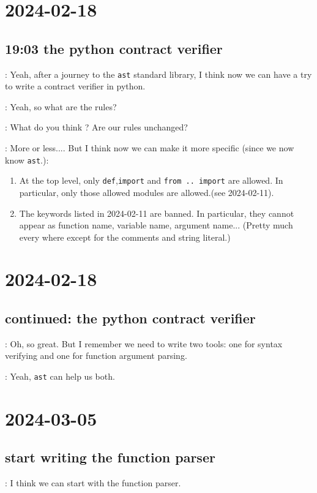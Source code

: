 \section*{2024-02-18}
\subsection*{19:03 the python contract verifier}

 : Yeah, after a journey to the \texttt{ast} standard library, I
think now we can have a try to write a contract verifier in python.

 : Yeah, so what are the rules?

 : What do you think ? Are our rules unchanged?

 : More or less.... But I think now we can make it more
specific (since we now know \texttt{ast}.):

\begin{enumerate}
\item At the top level, only \texttt{def},\texttt{import} and \texttt{from .. import}
  are allowed. In particular, only those allowed modules are allowed.(see
  2024-02-11).
\item The keywords listed in 2024-02-11 are banned. In particular, they cannot
  appear as function name, variable name, argument name... (Pretty much every
  where except for the comments and string literal.)
\end{enumerate}

\section*{2024-02-18}
\subsection*{continued: the python contract verifier}
 : Oh, so great. But I remember we need to write two tools: one
for syntax verifying and one for function argument parsing.

 : Yeah, \texttt{ast} can help us both.

\section*{2024-03-05}
\subsection*{start writing the function parser}
 : I think we can start with the function parser.


